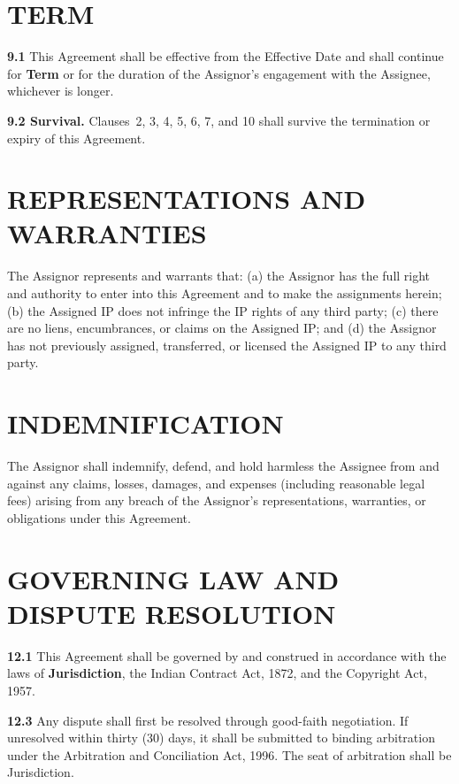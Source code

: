 \documentclass[10pt]{article}
\begin{document}
\section{TERM}

\textbf{9.1} This Agreement shall be effective from the Effective Date and shall continue for \textbf{{{Term}}} or for the duration of the Assignor's engagement with the Assignee, whichever is longer.

\textbf{9.2 Survival.} Clauses~2, 3, 4, 5, 6, 7, and 10 shall survive the termination or expiry of this Agreement.

\section{REPRESENTATIONS AND WARRANTIES}

The Assignor represents and warrants that: (a) the Assignor has the full right and authority to enter into this Agreement and to make the assignments herein; (b) the Assigned IP does not infringe the IP rights of any third party; (c) there are no liens, encumbrances, or claims on the Assigned IP; and (d) the Assignor has not previously assigned, transferred, or licensed the Assigned IP to any third party.

\section{INDEMNIFICATION}

The Assignor shall indemnify, defend, and hold harmless the Assignee from and against any claims, losses, damages, and expenses (including reasonable legal fees) arising from any breach of the Assignor's representations, warranties, or obligations under this Agreement.

\section{GOVERNING LAW AND DISPUTE RESOLUTION}

\textbf{12.1} This Agreement shall be governed by and construed in accordance with the laws of \textbf{{{Jurisdiction}}}, the Indian Contract Act, 1872, and the Copyright Act, 1957.


\textbf{12.3} Any dispute shall first be resolved through good-faith negotiation. If unresolved within thirty (30) days, it shall be submitted to binding arbitration under the Arbitration and Conciliation Act, 1996. The seat of arbitration shall be {{Jurisdiction}}.
\end{document}
